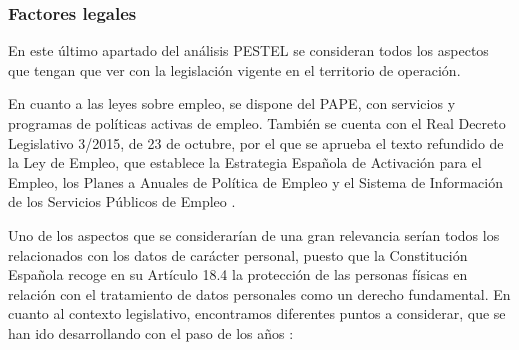 \clearpage

\subsubsection{Factores legales}
En este último apartado del análisis PESTEL se consideran todos los aspectos que tengan que ver con la legislación vigente en el territorio de operación.

En cuanto a las leyes sobre empleo, se dispone del \acf{PAPE}, con servicios y programas de políticas activas de empleo. También se cuenta con el Real Decreto Legislativo 3/2015, de 23 de octubre, por el que se aprueba el texto refundido de la Ley de Empleo, que establece la Estrategia Española de Activación para el Empleo, los Planes a Anuales de Política de Empleo y el Sistema de Información de los Servicios Públicos de Empleo \cite{politicassepe}. 

Uno de los aspectos que se considerarían de una gran relevancia serían todos los relacionados con los datos de carácter personal, puesto que la Constitución Española recoge en su Artículo 18.4 la protección de las personas físicas en relación con el tratamiento de datos personales como un derecho fundamental. En cuanto al contexto legislativo, encontramos diferentes puntos a considerar, que se han ido desarrollando con el paso de los años \cite{aepdnormativa}:

